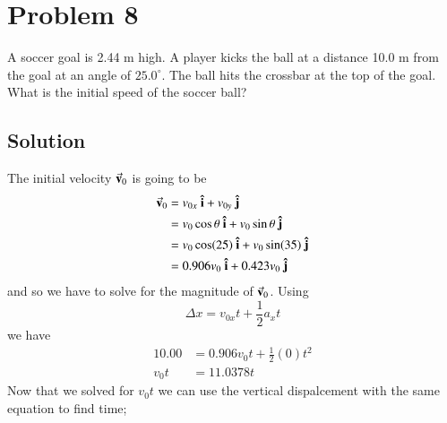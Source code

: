 \documentclass{article}
\begin{document}
\section*{Problem 8}
A soccer goal is 2.44 m high. A player kicks the ball at a distance 10.0 m from the goal at an angle of $25.0^\circ$.
The ball hits the crossbar at the top of the goal.
What is the initial speed of the soccer ball?

\subsection*{Solution}
The initial velocity $\va v_{0}$ is going to be
\begin{align*}
	\va v_0 &= v_{0x}\ \vu i + v_{0y}\ \vu j \\
		&= v_0 \cos \theta\ \vu i + v_0 \sin\theta\ \vu j \\
		&= v_0\cos(25)\ \vu i + v_0\sin(35)\ \vu j \\
		&= 0.906 v_0\ \vu i + 0.423 v_0\ \vu j
\end{align*}
and so we have to solve for the magnitude of $\va v_0$. Using
\begin{equation*}
	\Delta x = v_{0x} t + \frac{1}{2}a_x t
\end{equation*}
we have
\begin{align*}
	10.00 &= 0.906 v_0t + \frac{1}{2}(0) t^2 \\
	v_0t &= 11.0378 t
\end{align*}
Now that we solved for $v_0t$ we can use the vertical dispalcement with the same equation to find time;
\end{document}
